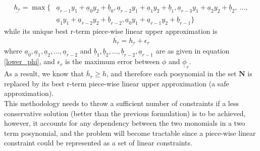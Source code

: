 \begin{equation}
\begin{aligned}
\underline{h_r} = \max \{&\underline{a}_{r-1}y_1 + \underline{a}_0y_2 + \underline{b}_0, \underline{a}_{r-2}y_1 + \underline{a}_1y_2 + \underline{b}_1, \underline{a}_{r-3}y_1 + \underline{a}_2y_2 + \underline{b}_2,\ ...,\\
& \underline{a}_{1}y_1 + \underline{a}_{r-2}y_2 + \underline{b}_{r-2}, \underline{a}_0y_1 + \underline{a}_{r-1}y_2 + \underline{b}_{r-1}\}
\end{aligned}
\end{equation}
while its unique best r-term piece-wise linear upper approximation is
\begin{equation}
\overline{h_r} = \underline{h_r} + \epsilon_r
\end{equation}
where $\underline{a}_{0}, \underline{a}_{1}, \underline{a}_{2}, ..., \underline{a}_{r-2}$ and $\underline{b}_{1}, \underline{b}_{2}, ..., \underline{b}_{r-2}, \underline{a}_{r-1}$ are as given in equation \eqref{lower_phi}, and $\epsilon_r$ is the maximum error between $\phi$ and $\underline{\phi}_r$.\\[12pt]
As a result, we know that $\overline{h}_r \geq h$, and therefore each posynomial in the set $\mathbf{N}$ is replaced by its best r-term piece-wise linear upper approximation (a safe approximation).\\[12pt]
This methodology needs to throw a sufficient number of constraints if a less conservative solution (better than the previous formulation) is to be achieved, however, it accounts for any dependency between the two monomials in a two term posynomial, and the problem will become tractable since a piece-wise linear constraint could be represented as a set of linear constraints.\\[12pt]


